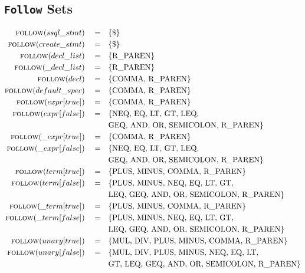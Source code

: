 \documentclass{article}
\begin{document}
\subsection{\texttt{Follow} Sets}
\begin{align*}
\textsc{follow}(ssql\_stmt)\quad =& \quad \{\text{\$}\} \\
\textsc{follow}(create\_stmt)\quad =& \quad \{\text{\$}\} \\
\textsc{follow}(decl\_list)\quad =& \quad \{\text{R\_PAREN}\} \\
\textsc{follow}(\_decl\_list)\quad =& \quad \{\text{R\_PAREN}\} \\
\textsc{follow}(decl)\quad =& \quad \{\text{COMMA, R\_PAREN}\} \\
\textsc{follow}(default\_spec)\quad =& \quad \{\text{COMMA, R\_PAREN}\} \\
\textsc{follow}(expr[true])\quad =& \quad \{\text{COMMA, R\_PAREN}\} \\
\textsc{follow}(expr[false])\quad =& \quad \{\text{NEQ, EQ, LT, GT, LEQ,}\\
 & \quad \text{GEQ, AND, OR, SEMICOLON, R\_PAREN}\} \\
\textsc{follow}(\_expr[true])\quad =& \quad \{\text{COMMA, R\_PAREN}\} \\
\textsc{follow}(\_expr[false])\quad =& \quad \{\text{NEQ, EQ, LT, GT, LEQ,}\\
& \quad \text{GEQ, AND, OR, SEMICOLON, R\_PAREN}\} \\
\textsc{follow}(term[true])\quad =& \quad \{\text{PLUS, MINUS, COMMA, R\_PAREN}\} \\
\textsc{follow}(term[false])\quad =& \quad \{\text{PLUS, MINUS, NEQ, EQ, LT, GT,}\\
& \quad \text{LEQ, GEQ, AND, OR, SEMICOLON, R\_PAREN}\} \\
\textsc{follow}(\_term[true])\quad =& \quad \{\text{PLUS, MINUS, COMMA, R\_PAREN}\} \\
\textsc{follow}(\_term[false])\quad =& \quad \{\text{PLUS, MINUS, NEQ, EQ, LT, GT,}\\
& \quad \text{LEQ, GEQ, AND, OR, SEMICOLON, R\_PAREN}\} \\
\textsc{follow}(unary[true])\quad =& \quad \{\text{MUL, DIV, PLUS, MINUS, COMMA, R\_PAREN}\} \\
\textsc{follow}(unary[false])\quad =& \quad \{\text{MUL, DIV, PLUS, MINUS, NEQ, EQ, LT,} \\
& \quad \text{GT, LEQ, GEQ, AND, OR, SEMICOLON, R\_PAREN}\} 

\end{align*}
\end{document}

